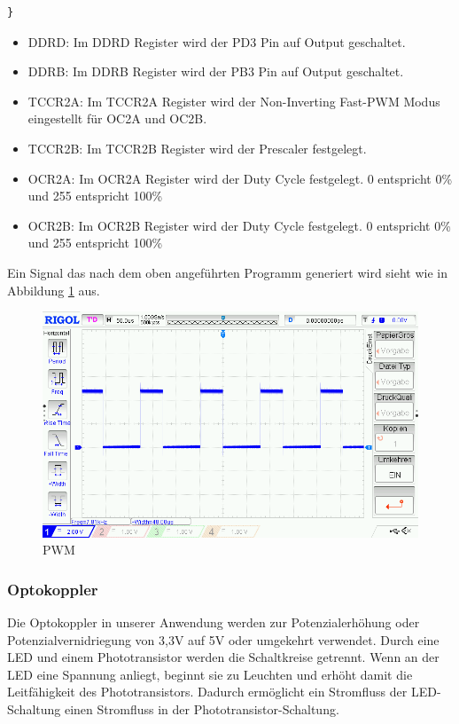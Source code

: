 \begin{itemize}
\begin{lstlisting}[caption=$\mu$C-Programm,style=C]
}
\end{lstlisting}

\begin{itemize}
\item DDRD: Im DDRD Register wird der PD3 Pin auf Output geschaltet.
\item DDRB: Im DDRB Register wird der PB3 Pin auf Output geschaltet.
\item TCCR2A: Im TCCR2A Register wird der Non-Inverting Fast-PWM Modus eingestellt für OC2A und OC2B. 
\item TCCR2B: Im TCCR2B Register wird der Prescaler festgelegt. 
\item OCR2A: Im OCR2A Register wird der Duty Cycle festgelegt. 0 entspricht 0\% und 255 entspricht 100\% 
\item OCR2B: Im OCR2B Register wird der Duty Cycle festgelegt. 0 entspricht 0\% und 255 entspricht 100\% 
\end{itemize}
\end{itemize}

Ein Signal das nach dem oben angeführten Programm generiert wird sieht wie in Abbildung \ref{PWM} aus.
\begin{figure}[H] 
\begin{center}

\includegraphics[width=13cm]{Bilder/PWM/pwm}
\caption{PWM}
\label{PWM}

\end{center}
\end{figure}

\subsubsection{Optokoppler}

Die Optokoppler in unserer Anwendung werden zur Potenzialerhöhung oder Potenzialvernidriegung von 3,3V auf 5V oder umgekehrt verwendet. Durch eine LED und einem Phototransistor werden die Schaltkreise getrennt. Wenn an der LED eine Spannung anliegt, beginnt sie zu Leuchten und erhöht damit die Leitfähigkeit des Phototransistors. Dadurch ermöglicht ein Stromfluss der LED-Schaltung einen Stromfluss in der Phototransistor-Schaltung.

